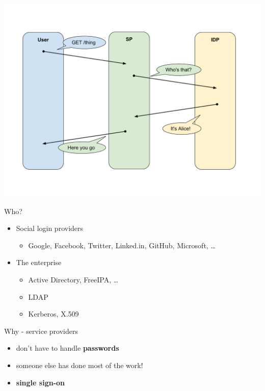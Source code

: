 \documentclass[ignorenonframetext,aspectratio=169]{beamer}
\providecommand{\tightlist}{%
  \setlength{\itemsep}{0pt}\setlength{\parskip}{0pt}}
\begin{document}
\begin{frame}[plain]
\centering
\includegraphics[height=\paperheight]{fedsso-basic.pdf}
\end{frame}

\begin{frame}{Who?}
\begin{itemize}

\tightlist
\item Social login providers
\begin{itemize}
\tightlist
\item Google, Facebook, Twitter, Linked.in, GitHub, Microsoft, \ldots
\end{itemize}

\item{The enterprise}
\begin{itemize}
\tightlist
\item Active Directory, FreeIPA, \ldots
\item LDAP
\item Kerberos, X.509
\end{itemize}

\end{itemize}
\end{frame}

\begin{frame}{Why - service providers}

\begin{itemize}
\tightlist
\item don't have to handle {\bf passwords}
\item someone else has done most of the work!
\item \bf single sign-on
\end{itemize}

\end{frame}
\end{document}
